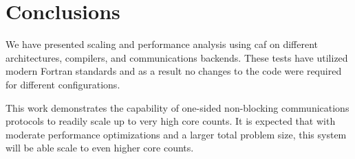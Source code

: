 \section{Conclusions}
We have presented scaling and performance analysis using \gls{caf} on different architectures, compilers, and communications backends.
These tests have utilized modern Fortran standards and as a result no changes to the code were required for different configurations.

This work demonstrates the capability of one-sided non-blocking communications protocols to readily scale up to very high core counts.
It is expected that with moderate performance optimizations and a larger total problem size, this system will be able scale to even higher core counts.








